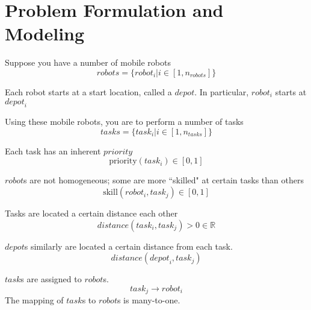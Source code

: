 \documentclass[a4paper]{article}
\begin{document}
\section{Problem Formulation and Modeling}


%
%


Suppose you have a number of mobile robots
$$\mathit{robots} = \{ \mathit{robot}_i | i \in [1, n_\mathit{robots}] \}$$

Each robot starts at a start location, called a $\mathit{depot}$. In particular, $\mathit{robot}_i$ starts at $\mathit{depot}_i$

Using these mobile robots, you are to perform a number of tasks
$$\mathit{tasks} = \{ \mathit{task}_i | i \in [1, n_\mathit{tasks}] \}$$

Each task has an inherent $\mathit{priority}$
$$\text{priority}(\mathit{task}_i) \in [0 ,1]$$

$\mathit{robot}$s are not homogeneous; some are more ``skilled" at certain tasks than others
$$\text{skill}(\mathit{robot}_i, \mathit{task}_j) \in [0 ,1]$$

Tasks are located a certain distance each other
$$\mathit{distance}(\mathit{task}_i, \mathit{task}_j) > 0 \in \mathbb{R}$$

$\textit{depot}$s similarly are located a certain distance from each task.
$$\mathit{distance}(\mathit{depot}_i, \mathit{task}_j)$$

$\mathit{task}$s are assigned to $\mathit{robot}$s.
$$\mathit{task}_j \rightarrow \mathit{robot}_i$$
The mapping of $\mathit{task}$s to $\mathit{robot}$s is many-to-one.
\end{document}
